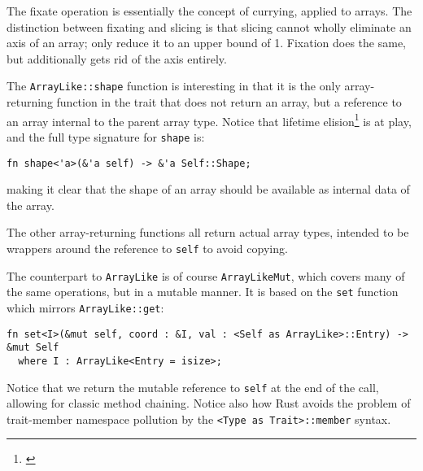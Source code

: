 \documentclass{DIKU-report-variant}
\begin{document}
The fixate operation is essentially the concept of currying, applied to arrays.
The distinction between fixating and slicing is that slicing cannot wholly eliminate an axis of
an array; only reduce it to an upper bound of 1. Fixation does the same, but additionally gets rid
of the axis entirely.

The \texttt{ArrayLike::shape} function is interesting in that it is the only array-returning function in the
trait that does not return an array, but a reference to an array internal to the parent array type.
Notice that lifetime elision\footnote{\cite[chapter~3.4]{RNOM117}} is at play, and the full type signature
for \texttt{shape} is:
\begin{lstlisting}
fn shape<'a>(&'a self) -> &'a Self::Shape;
\end{lstlisting}
making it clear that the shape of an array should be available as internal data of the array.

The other array-returning functions all return actual array types, intended to be wrappers around
the reference to \texttt{self} to avoid copying.

The counterpart to \texttt{ArrayLike} is of course \texttt{ArrayLikeMut}, which covers many
of the same operations, but in a mutable manner. It is based on the \texttt{set} function which
mirrors \texttt{ArrayLike::get}:
\begin{lstlisting}
fn set<I>(&mut self, coord : &I, val : <Self as ArrayLike>::Entry) -> &mut Self
  where I : ArrayLike<Entry = isize>;
\end{lstlisting}
Notice that we return the mutable reference to \texttt{self} at the end of the call,
allowing for classic method chaining. Notice also how Rust avoids the problem of trait-member
namespace pollution by the \texttt{<Type as Trait>::member} syntax.
\end{document}
